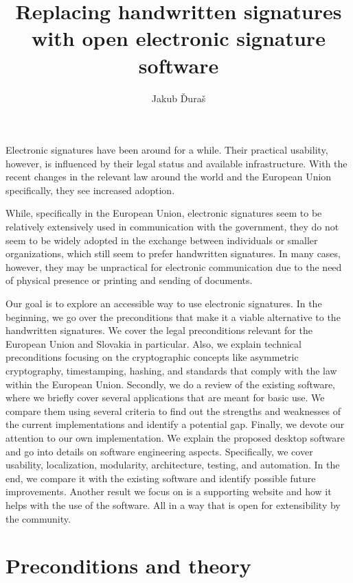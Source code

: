 \documentclass[thesismargins, english, thesislinespacing, onelinechapterstyle, upjsfrontpage]{rnthesis}
\title{Replacing handwritten signatures with open electronic signature software}
\author{Jakub Ďuraš}
\begin{document}
\maketitle

\newpage

\tableofcontents

\uvod

Electronic signatures have been around for a while.
Their practical usability, however, is influenced by their legal status and available infrastructure.
With the recent changes in the relevant law around the world and the European Union specifically, they see increased adoption.

While, specifically in the European Union, electronic signatures seem to be relatively extensively used in communication with the government, they do not seem to be widely adopted in the exchange between individuals or smaller organizations, which still seem to prefer handwritten signatures.
In many cases, however, they may be unpractical for electronic communication due to the need of physical presence or printing and sending of documents.

Our goal is to explore an accessible way to use electronic signatures.
In the beginning, we go over the preconditions that make it a viable alternative to the handwritten signatures.
We cover the legal preconditions relevant for the European Union and Slovakia in particular.
Also, we explain technical preconditions focusing on the cryptographic concepts like asymmetric cryptography, timestamping, hashing, and standards that comply with the law within the European Union.
Secondly, we do a review of the existing software, where we briefly cover several applications that are meant for basic use.
We compare them using several criteria to find out the strengths and weaknesses of the current implementations and identify a potential gap.
Finally, we devote our attention to our own implementation.
We explain the proposed desktop software and go into details on software engineering aspects.
Specifically, we cover usability, localization, modularity, architecture, testing, and automation.
In the end, we compare it with the existing software and identify possible future improvements.
Another result we focus on is a supporting website and how it helps with the use of the software.
All in a way that is open for extensibility by the community.

\chapter{Preconditions and theory}
\end{document}
